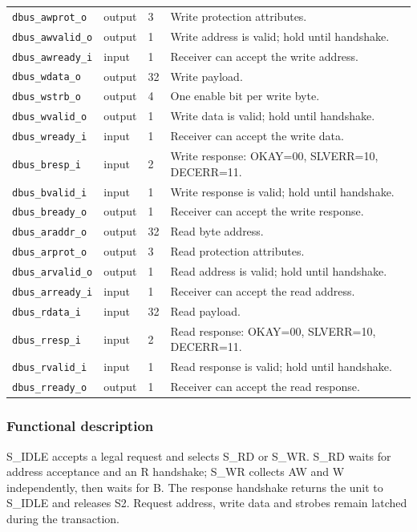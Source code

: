 \documentclass[11pt]{article}
\begin{document}
{\begin{longtable}{@{}L{0.3400\dimexpr\linewidth-36pt\relax}L{0.1000\dimexpr\linewidth-36pt\relax}L{0.1000\dimexpr\linewidth-36pt\relax}L{0.4600\dimexpr\linewidth-36pt\relax}@{}}
\texttt{dbus\_awprot\_o} & output & 3 & Write protection attributes. \\ \addlinespace[3pt]
\texttt{dbus\_awvalid\_o} & output & 1 & Write address is valid; hold until handshake. \\ \addlinespace[3pt]
\texttt{dbus\_awready\_i} & input & 1 & Receiver can accept the write address. \\ \addlinespace[3pt]
\texttt{dbus\_wdata\_o} & output & 32 & Write payload. \\ \addlinespace[3pt]
\texttt{dbus\_wstrb\_o} & output & 4 & One enable bit per write byte. \\ \addlinespace[3pt]
\texttt{dbus\_wvalid\_o} & output & 1 & Write data is valid; hold until handshake. \\ \addlinespace[3pt]
\texttt{dbus\_wready\_i} & input & 1 & Receiver can accept the write data. \\ \addlinespace[3pt]
\texttt{dbus\_bresp\_i} & input & 2 & Write response: OKAY=00, SLVERR=10, DECERR=11. \\ \addlinespace[3pt]
\texttt{dbus\_bvalid\_i} & input & 1 & Write response is valid; hold until handshake. \\ \addlinespace[3pt]
\texttt{dbus\_bready\_o} & output & 1 & Receiver can accept the write response. \\ \addlinespace[3pt]
\texttt{dbus\_araddr\_o} & output & 32 & Read byte address. \\ \addlinespace[3pt]
\texttt{dbus\_arprot\_o} & output & 3 & Read protection attributes. \\ \addlinespace[3pt]
\texttt{dbus\_arvalid\_o} & output & 1 & Read address is valid; hold until handshake. \\ \addlinespace[3pt]
\texttt{dbus\_arready\_i} & input & 1 & Receiver can accept the read address. \\ \addlinespace[3pt]
\texttt{dbus\_rdata\_i} & input & 32 & Read payload. \\ \addlinespace[3pt]
\texttt{dbus\_rresp\_i} & input & 2 & Read response: OKAY=00, SLVERR=10, DECERR=11. \\ \addlinespace[3pt]
\texttt{dbus\_rvalid\_i} & input & 1 & Read response is valid; hold until handshake. \\ \addlinespace[3pt]
\texttt{dbus\_rready\_o} & output & 1 & Receiver can accept the read response. \\*
\bottomrule\end{longtable}}
\subsubsection{Functional description}
\noindent S\_IDLE accepts a legal request and selects S\_RD or S\_WR. S\_RD waits for address acceptance and an R handshake; S\_WR collects AW and W independently, then waits for B. The response handshake returns the unit to S\_IDLE and releases S2. Request address, write data and strobes remain latched during the transaction.\par\medskip
\end{document}

